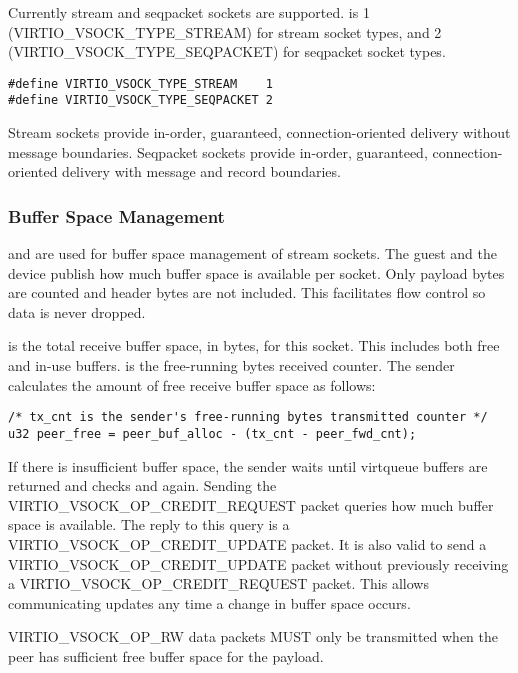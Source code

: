 Currently stream and seqpacket sockets are supported.  is 1 (VIRTIO_VSOCK_TYPE_STREAM)
for stream socket types, and 2 (VIRTIO_VSOCK_TYPE_SEQPACKET) for seqpacket socket types.

\begin{lstlisting}
#define VIRTIO_VSOCK_TYPE_STREAM    1
#define VIRTIO_VSOCK_TYPE_SEQPACKET 2
\end{lstlisting}

Stream sockets provide in-order, guaranteed, connection-oriented delivery
without message boundaries. Seqpacket sockets provide in-order, guaranteed,
connection-oriented delivery with message and record boundaries.

\subsubsection{Buffer Space Management}\label{sec:Device Types / Socket Device / Device Operation / Buffer Space Management}
 and  are used for buffer space management of
stream sockets. The guest and the device publish how much buffer space is
available per socket. Only payload bytes are counted and header bytes are not
included. This facilitates flow control so data is never dropped.

 is the total receive buffer space, in bytes, for this socket.
This includes both free and in-use buffers.  is the free-running
bytes received counter. The sender calculates the amount of free receive buffer
space as follows:

\begin{lstlisting}
/* tx_cnt is the sender's free-running bytes transmitted counter */
u32 peer_free = peer_buf_alloc - (tx_cnt - peer_fwd_cnt);
\end{lstlisting}

If there is insufficient buffer space, the sender waits until virtqueue buffers
are returned and checks  and  again. Sending
the VIRTIO_VSOCK_OP_CREDIT_REQUEST packet queries how much buffer space is
available. The reply to this query is a VIRTIO_VSOCK_OP_CREDIT_UPDATE packet.
It is also valid to send a VIRTIO_VSOCK_OP_CREDIT_UPDATE packet without
previously receiving a VIRTIO_VSOCK_OP_CREDIT_REQUEST packet. This allows
communicating updates any time a change in buffer space occurs.

VIRTIO_VSOCK_OP_RW data packets MUST only be transmitted when the peer has
sufficient free buffer space for the payload.

